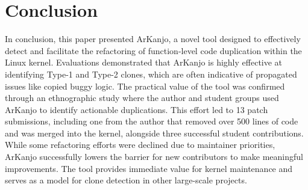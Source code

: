 \documentclass[conference]{IEEEtran}
\begin{document}
\section{Conclusion}

In conclusion, this paper presented ArKanjo, a novel tool designed to effectively detect 
and facilitate the refactoring of function-level code duplication within the Linux kernel. 
Evaluations demonstrated that ArKanjo is highly effective at identifying Type-1 and Type-2 
clones, which are often indicative of propagated issues like copied buggy logic. The practical 
value of the tool was confirmed through an ethnographic study where the author and student 
groups used ArKanjo to identify actionable duplications. This effort led to 13 patch 
submissions, including one from the author that removed over 500 lines of code and was merged 
into the kernel, alongside three successful student contributions. While some refactoring 
efforts were declined due to maintainer priorities, ArKanjo successfully lowers the barrier 
for new contributors to make meaningful improvements. The tool provides immediate value for 
kernel maintenance and serves as a model for clone detection in other large-scale projects.




\end{document}

